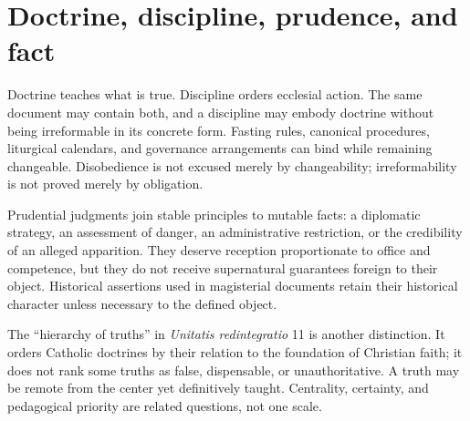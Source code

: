 \section{Doctrine, discipline, prudence, and fact}

Doctrine teaches what is true. Discipline orders ecclesial action. The same
document may contain both, and a discipline may embody doctrine without being
irreformable in its concrete form. Fasting rules, canonical procedures,
liturgical calendars, and governance arrangements can bind while remaining
changeable. Disobedience is not excused merely by changeability; irreformability
is not proved merely by obligation.

Prudential judgments join stable principles to mutable facts: a diplomatic
strategy, an assessment of danger, an administrative restriction, or the
credibility of an alleged apparition. They deserve reception proportionate to
office and competence, but they do not receive supernatural guarantees
foreign to their object. Historical assertions used in magisterial documents
retain their historical character unless necessary to the defined object.

The ``hierarchy of truths'' in \emph{Unitatis redintegratio} 11 is another
distinction. It orders Catholic doctrines by their relation to the foundation
of Christian faith; it does not rank some truths as false, dispensable, or
unauthoritative. A truth may be remote from the center yet definitively taught.
Centrality, certainty, and pedagogical priority are related questions, not one
scale.

